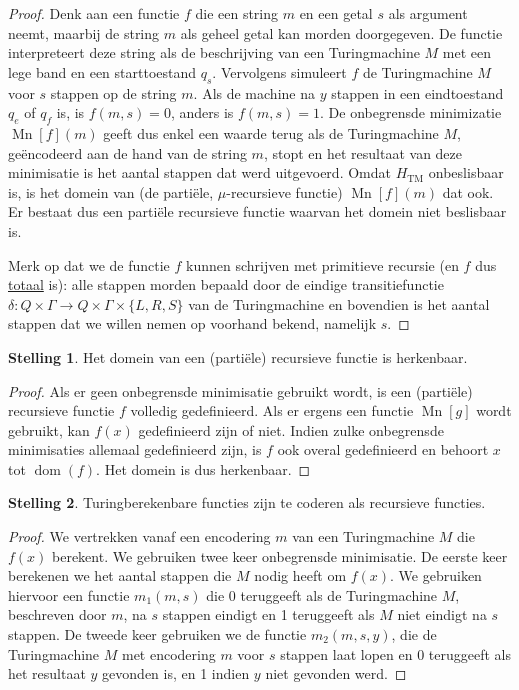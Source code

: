 \documentclass[kulak]{kulakarticle}
\theoremstyle{definition}
\newtheorem*{stelling}{Stelling}
\begin{document}
	\begin{proof}
		Denk aan een functie \(f\) die een string \(m\) en een getal \(s\) als argument neemt, maarbij de string \(m\) als geheel getal kan morden doorgegeven. De functie interpreteert deze string als de beschrijving van een Turingmachine \(M\) met een lege band en een starttoestand \(q_s\). Vervolgens simuleert \(f\) de Turingmachine \(M\) voor \(s\) stappen op de string \(m\). Als de machine na \(y\) stappen in een eindtoestand \(q_e\) of \(q_f\) is, is \(f(m,s)=0\), anders is \(f(m,s)=1\). De onbegrensde minimizatie \(\operatorname{Mn}[f](m)\) geeft dus enkel een waarde terug als de Turingmachine \(M\), geëncodeerd aan de hand van de string \(m\), stopt en het resultaat van deze minimisatie is het aantal stappen dat werd uitgevoerd. Omdat \(H_\text{TM}\) onbeslisbaar is, is het domein van (de partiële, \(\mu\)-recursieve functie) \(\operatorname{Mn}[f](m)\) dat ook. Er bestaat dus een partiële recursieve functie waarvan het domein niet beslisbaar is.

		Merk op dat we de functie \(f\) kunnen schrijven met primitieve recursie (en \(f\) dus \underline{totaal} is): alle stappen morden bepaald door de eindige transitiefunctie \(\delta : Q \times \Gamma \to Q \times \Gamma \times \{L,R,S\}\) van de Turingmachine en bovendien is het aantal stappen dat we willen nemen op voorhand bekend, namelijk \(s\).
	\end{proof}

	\begin{stelling}
		Het domein van een (partiële) recursieve functie is herkenbaar.
	\end{stelling}

	\begin{proof}
		Als er geen onbegrensde minimisatie gebruikt wordt, is een (partiële) recursieve functie \(f\) volledig gedefinieerd. Als er ergens een functie \(\operatorname{Mn}[g]\) wordt gebruikt, kan \(f(x)\) gedefinieerd zijn of niet. Indien zulke onbegrensde minimisaties allemaal gedefinieerd zijn, is \(f\) ook overal gedefinieerd en behoort \(x\) tot \(\operatorname{dom}(f)\). Het domein is dus herkenbaar.
	\end{proof}

	\begin{stelling}
		Turingberekenbare functies zijn te coderen als recursieve functies.
	\end{stelling}

	\begin{proof}
		We vertrekken vanaf een encodering \(m\) van een Turingmachine \(M\) die \(f(x)\) berekent. We gebruiken twee keer onbegrensde minimisatie. De eerste keer berekenen we het aantal stappen die \(M\) nodig heeft om \(f(x)\). We gebruiken hiervoor een functie \(m_1(m,s)\) die 0 teruggeeft als de Turingmachine \(M\), beschreven door \(m\), na \(s\) stappen eindigt en 1 teruggeeft als \(M\) niet eindigt na \(s\) stappen. De tweede keer gebruiken we de functie \(m_2(m,s,y)\), die de Turingmachine \(M\) met encodering \(m\) voor \(s\) stappen laat lopen en 0 teruggeeft als het resultaat \(y\) gevonden is, en 1 indien \(y\) niet gevonden werd.
	\end{proof}
\end{document}

